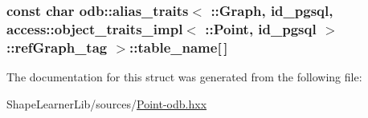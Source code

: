 \subsubsection[{table\+\_\+name}]{\setlength{\rightskip}{0pt plus 5cm}const char odb\+::alias\+\_\+traits$<$ \+::{\bf Graph}, id\+\_\+pgsql, access\+::object\+\_\+traits\+\_\+impl$<$ \+::{\bf Point}, id\+\_\+pgsql $>$\+::ref\+Graph\+\_\+tag $>$\+::table\+\_\+name\mbox{[}$\,$\mbox{]}\hspace{0.3cm}{\ttfamily [static]}}\label{structodb_1_1alias__traits_3_01_1_1_graph_00_01id__pgsql_00_01access_1_1object__traits__impl_3_031ce39b3df44385fcc4600d018caae95_affdc73c6bce0fa8c88fcc308d7cf780e}


The documentation for this struct was generated from the following file\+:\begin{DoxyCompactItemize}
\item 
Shape\+Learner\+Lib/sources/\hyperlink{_point-odb_8hxx}{Point-\/odb.\+hxx}\end{DoxyCompactItemize}
